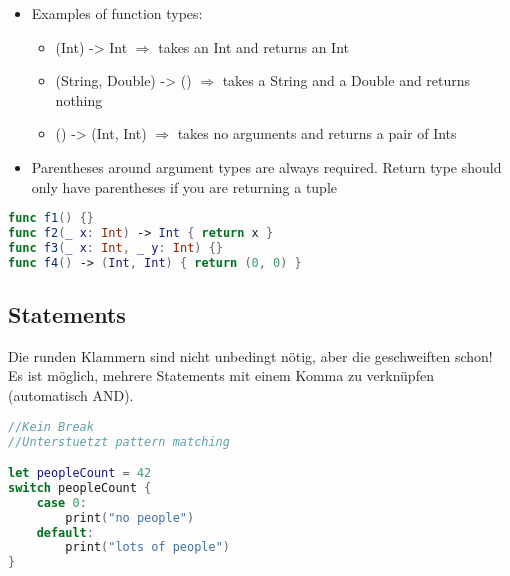 \columnbreak
\begin{breakbox}

\begin{itemize}
\tightlist
\item
  Examples of function types:

  \begin{itemize}
  \tightlist
  \item
    (Int) -> Int $\Rightarrow$ takes an Int and returns an Int
  \item
    (String, Double) -> () $\Rightarrow$ takes a String and a Double
    and returns nothing
  \item
    () -> (Int, Int) $\Rightarrow$ takes no arguments and returns a
    pair of Ints
  \end{itemize}
\item
  Parentheses around argument types are always required. Return type
  should only have parentheses if you are returning a tuple
\end{itemize}

\begin{lstlisting}[language=swift]
func f1() {}
func f2(_ x: Int) -> Int { return x }
func f3(_ x: Int, _ y: Int) {}
func f4() -> (Int, Int) { return (0, 0) }
\end{lstlisting}
\end{breakbox}

\subsection{Statements}

\begin{breakbox}

Die runden Klammern sind nicht unbedingt nötig, aber die geschweiften
schon! Es ist möglich, mehrere Statements mit einem Komma zu verknüpfen
(automatisch AND).
\end{breakbox}

\begin{breakbox}


\begin{lstlisting}[language=swift]
//Kein Break
//Unterstuetzt pattern matching

let peopleCount = 42
switch peopleCount {
    case 0:
        print("no people")
    default:
        print("lots of people")
}
\end{lstlisting}
\end{breakbox}

